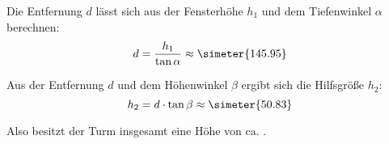 \begin{exercise}
    Die Entfernung $d$ lässt sich aus der Fensterhöhe $h_{1}$ und dem Tiefenwinkel $\alpha$ berechnen:
    \begin{equation*}
      d=\frac{h_{1}}{\tan\alpha}\approx\simeter{145.95}
    \end{equation*}

    Aus der Entfernung $d$ und dem Höhenwinkel $\beta$ ergibt sich die Hilfsgröße $h_{2}$:
    \begin{equation*}
      h_{2}=d\cdot\tan\beta\approx\simeter{50.83}
    \end{equation*}

    Also besitzt der Turm insgesamt eine Höhe von ca. .
  \fi
\end{exercise}
